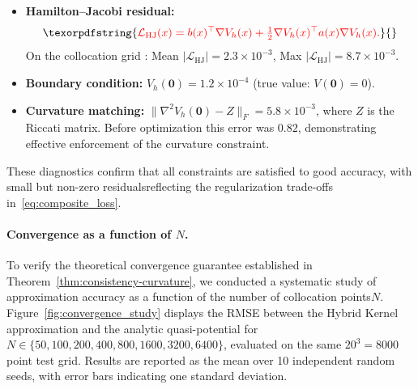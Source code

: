 \documentclass[11pt]{article}
\theoremstyle{plain}      %
\theoremstyle{definition} %
\providecommand{\DIFdeltex}[1]{{\protect\color{red}#1}} %
\providecommand{\DIFdelbegin}{} %
\providecommand{\DIFdel}[1]{\texorpdfstring{\DIFdeltex{#1}}{}} %
\newcommand{\DIFscaledelfig}{1.0}
\newlength{\DIFdelgraphicswidth} %
\newlength{\DIFdelgraphicsheight} %
\newcommand{\DIFdelincludegraphics}[2][]{%
\sbox{\DIFdelgraphicsbox}{\DIFOincludegraphics[#1]{#2}}%
\settoboxwidth{\DIFdelgraphicswidth}{\DIFdelgraphicsbox} %
\settoboxtotalheight{\DIFdelgraphicsheight}{\DIFdelgraphicsbox} %
\scalebox{\DIFscaledelfig}{%
\parbox[b]{\DIFdelgraphicswidth}{\usebox{\DIFdelgraphicsbox}\\[-\baselineskip] \rule{\DIFdelgraphicswidth}{0em}}\llap{\resizebox{\DIFdelgraphicswidth}{\DIFdelgraphicsheight}{%
\setlength{\unitlength}{\DIFdelgraphicswidth}%
\begin{picture}(1,1)%
\thicklines\linethickness{2pt} %
{\color[rgb]{1,0,0}\put(0,0){\framebox(1,1){}}}%
{\color[rgb]{1,0,0}\put(0,0){\line( 1,1){1}}}%
{\color[rgb]{1,0,0}\put(0,1){\line(1,-1){1}}}%
\end{picture}%
}\hspace*{3pt}}} %
} %
\DeclareRobustCommand{\DIFdelbegin}{\DIFOdelbegin \let\includegraphics\DIFdelincludegraphics} %
\begin{document}
\DIFdelbegin %
\begin{itemize}%
\item%
\DIFdel{\textbf{Hamilton--Jacobi residual:} 
}\begin{displaymath}\DIFdel{\label{eq:HJ_residual}
\mathcal{L}_{\text{HJ}}(x) = b(x)^\top \nabla V_h(x) + \tfrac{1}{2} \nabla V_h(x)^\top a(x) \nabla V_h(x).
}\end{displaymath}%
\DIFdel{On the collocation grid : Mean $|\mathcal{L}_{\text{HJ}}| = 2.3 \times 10^{-3}$, Max $|\mathcal{L}_{\text{HJ}}| = 8.7 \times 10^{-3}$. }%

\item%
\DIFdel{\textbf{Boundary condition:} $V_h(\mathbf{0}) = 1.2 \times 10^{-4}$ 
(true value: $V(\mathbf{0}) = 0$). }%

\item%
\DIFdel{\textbf{Curvature matching:} $\|\nabla^2 V_h(\mathbf{0}) - Z\|_F = 5.8 \times 10^{-3}$, 
where $Z$ is the Riccati matrix. Before optimization this error was $0.82$, demonstrating effective enforcement of the curvature constraint.
}
\end{itemize}%

\DIFdel{These diagnostics confirm that all constraints are satisfied to good accuracy, 
with small but non-zero residualsreflecting the regularization trade-offs 
in~\eqref{eq:composite_loss}. }%

\paragraph{\DIFdel{Convergence as a function of $N$.}}
\addtocounter{paragraph}{-1}%
\DIFdel{To verify the theoretical convergence guarantee established in 
Theorem~\ref{thm:consistency-curvature}, we conducted a systematic study of approximation 
accuracy as a function of the number of collocation points$N$. 
Figure~\ref{fig:convergence_study} displays the RMSE between the Hybrid Kernel 
approximation and the analytic quasi-potential for $N \in \{50, 100, 200, 400, 800, 1600, 3200, 6400\}$, evaluated on the same $20^3 = 8000$ point test grid. Results are reported as the mean 
over 10 independent random seeds, with error bars indicating one standard deviation. }%
\end{document}
